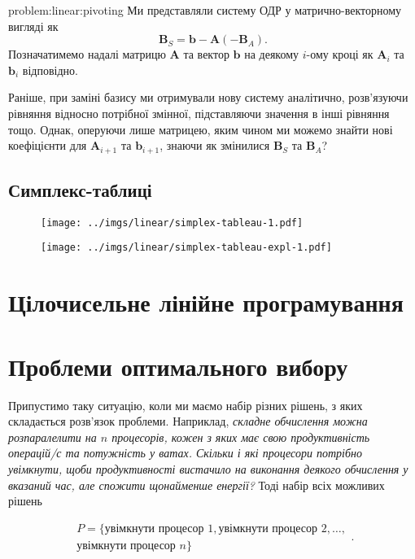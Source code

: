 \documentclass[\main/book.tex]{subfiles}
\begin{document}
\begin{problem}{problem:linear:pivoting}
 Ми представляли систему ОДР у матрично-векторному вигляді як
 \[
  \mathbf{B}_S = \mathbf{b} - \mathbf{A}(-\mathbf{B}_A)
  \text{.}
 \]
 Позначатимемо надалі матрицю $\mathbf{A}$ та вектор $\mathbf{b}$ на деякому $i$-ому кроці як $\mathbf{A}_i$ та $\mathbf{b}_i$ відповідно.

 Раніше, при заміні базису ми отримували нову систему аналітично, розв'язуючи рівняння відносно потрібної змінної, підставляючи значення в інші рівняння тощо. Однак, оперуючи лише матрицею, яким чином ми можемо знайти нові коефіцієнти для $\mathbf{A}_{i+1}$ та $\mathbf{b}_{i+1}$, знаючи як змінилися $\mathbf{B}_S$ та $\mathbf{B}_A$?
\end{problem}

\subsection{Симплекс-таблиці}

\begin{figure}
 \centering
 \texttt{[image: ../imgs/linear/simplex-tableau-1.pdf]}
\end{figure}

\begin{figure}
 \centering
 \texttt{[image: ../imgs/linear/simplex-tableau-expl-1.pdf]}
\end{figure}
\section{Цілочисельне лінійне програмування}
\label{section:linear:integer}

\section{Проблеми оптимального вибору}
\label{section:linear:x_in_0-1}

Припустимо таку ситуацію, коли ми маємо набір різних рішень, з яких складається розв'язок проблеми. Наприклад, \textit{складне обчислення можна розпаралелити на $n$ процесорів, кожен з яких має свою продуктивність операцій/с та потужність у ватах. Скільки і які процесори потрібно увімкнути, щоби продуктивності вистачило на виконання деякого обчислення у вказаний час, але спожити щонайменше енергії?} Тоді набір всіх можливих рішень

\[
\begin{split}
P = \{
 \text{увімкнути процесор 1},
 \text{увімкнути процесор 2},
 \ldots, \\
 \text{увімкнути процесор $n$}
\}
\end{split}
.
\]
\end{document}
